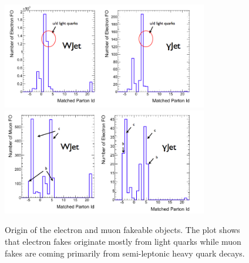 \documentclass{cmspaper}
\begin{document}
\begin{figure}[!htbp]                                                                                         
\begin{center}                                                                                                
\includegraphics[width=0.8\textwidth]{figures/ElectronFakeOrigin.png}                                            
\includegraphics[width=0.8\textwidth]{figures/MuonFakeOrigin.png}\\                                           
\caption{ Origin of the electron and muon fakeable objects. The plot shows 
that electron fakes originate mostly from light quarks while muon fakes
are coming primarily from semi-leptonic heavy quark decays.}
\label{fig:fakeorigins}                                                                                          
\end{center}                                                                                                  
\end{figure}   
\end{document}
